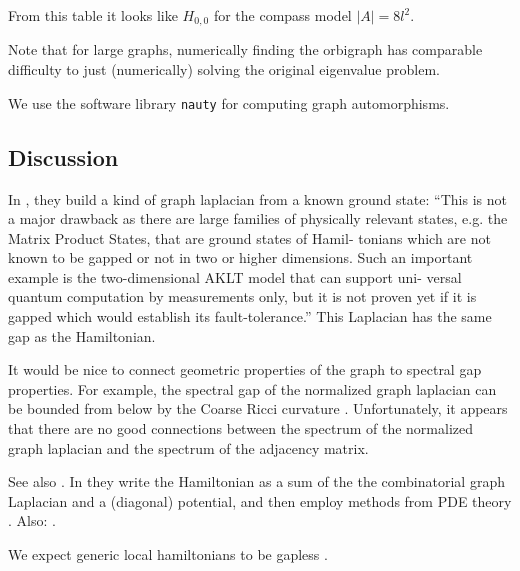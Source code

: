 \documentclass[12pt]{article}
\begin{document}
From this table it looks like $H_{0,0}$ for the compass model $|A| = 8l^2.$

Note that for large graphs, numerically finding the orbigraph has comparable
difficulty to just (numerically) solving the original eigenvalue problem.

We use the software library {\tt nauty}\cite{McKay2014} for computing graph automorphisms.


%
%


\subsection{Discussion}

In \cite{AlShimary2010}, they 
build a kind of graph laplacian from a known ground state:
``This is not a major drawback as there
are large families of physically relevant states, e.g. the
Matrix Product States, that are ground states of Hamil-
tonians which are not known to be gapped or not in two
or higher dimensions. Such an important example is
the two-dimensional AKLT model that can support uni-
versal quantum computation by measurements only, but
it is not proven yet if it is gapped which would establish
its fault-tolerance.''
This Laplacian has the same gap as the Hamiltonian.

It would be nice to connect geometric properties of the
graph to spectral gap properties. For example, the spectral gap of
the normalized graph laplacian can be bounded from below
by the Coarse Ricci curvature \cite{Lin2011}. 
Unfortunately, it appears
that there are no good connections between the spectrum
of the normalized graph laplacian and the spectrum of the adjacency matrix.

See also \cite{Jarret2014,Jarret2015}. 
In \cite{Jarret2015modulus} they
write the Hamiltonian as a sum of the
the combinatorial graph Laplacian and a (diagonal) potential, 
and then employ methods from PDE theory \cite{Andrews2011}.
Also: \cite{Baume2016}. %

We expect generic local hamiltonians to be gapless \cite{Movassagh2016}.

%
%
\end{document}
